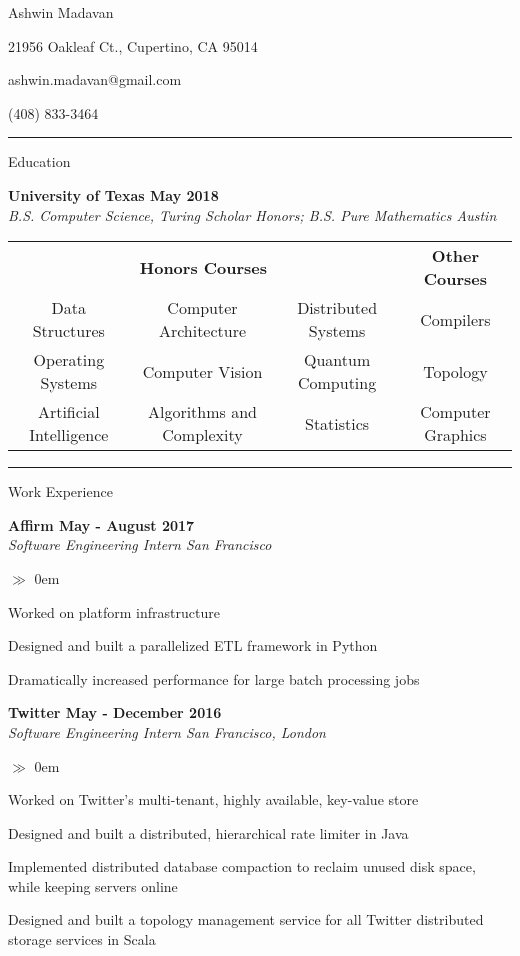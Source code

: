 \documentclass{article}
\begin{document}

\centerline{\LARGE \sc Ashwin Madavan}
\centerline{21956 Oakleaf Ct., Cupertino, CA 95014}
\centerline{ashwin.madavan@gmail.com}
\centerline{(408) 833-3464}
\medskip\hrule\medskip

\centerline{\large \sc Education}\smallskip 
\noindent\textbf{University of Texas \hfill{May 2018}} \\
\noindent\emph{B.S. Computer Science, Turing Scholar Honors; B.S. Pure Mathematics \hfill{Austin}}

\begin{center}
\begin{tabular}{ c c c c }
\multicolumn{3}{c}{\textbf{Honors Courses}} & \multicolumn{1}{c}{\textbf{Other Courses}} \\
Data Structures & Computer Architecture & Distributed Systems & Compilers \\
Operating Systems & Computer Vision & Quantum Computing & Topology \\
Artificial Intelligence & Algorithms and Complexity & Statistics & Computer Graphics \\
\end{tabular}
\end{center}

\hrule\medskip
\centerline{\large \sc Work Experience} \smallskip
\noindent\textbf{Affirm \hfill{May - August 2017}}\\
\noindent\emph{Software Engineering Intern \hfill{San Francisco}}
\begin{list}{$\gg$}{}  
  \itemsep0em
  \item Worked on platform infrastructure
  \item Designed and built a parallelized ETL framework in Python
  \item Dramatically increased performance for large batch processing jobs
\end{list}

\noindent\textbf{Twitter \hfill{May - December 2016}}\\
\noindent\emph{Software Engineering Intern \hfill{San Francisco, London}}
\begin{list}{$\gg$}{}  
  \itemsep0em
  \item Worked on Twitter's multi-tenant, highly available, key-value store
  \item Designed and built a distributed, hierarchical rate limiter in Java
  \item Implemented distributed database compaction to reclaim unused disk space, while keeping servers online
  \item Designed and built a topology management service for all Twitter distributed storage services in Scala
\end{list}
\end{document}
